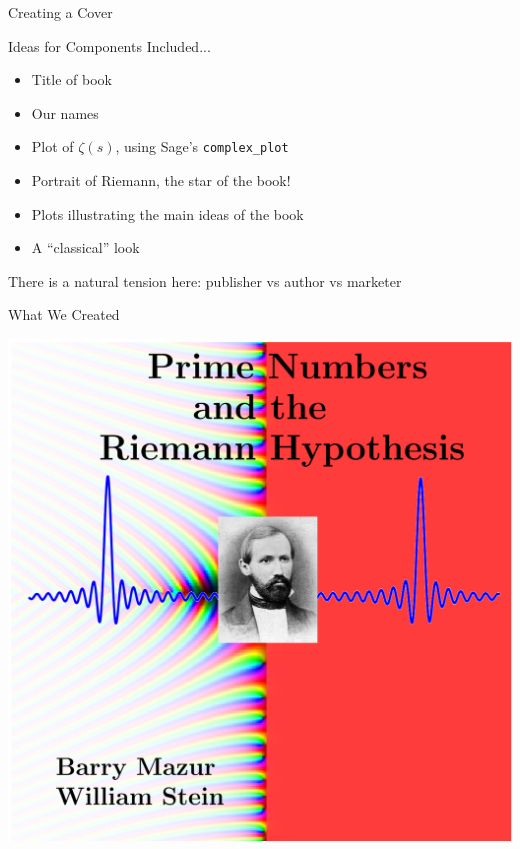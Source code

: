 \documentclass{beamer}
\begin{document}
\begin{frame}{Creating a Cover}


  \begin{block}{Ideas for Components Included...}
    \begin{itemize}
      \item Title of book
      \item Our names
      \item Plot of $\zeta(s)$, using Sage's {\tt complex\_plot}
      \item Portrait of Riemann, the star of the book!
      \item Plots illustrating the main ideas of the book
      \item A ``classical'' look
    \end{itemize}
  \end{block}

  \vfill
  There is a natural tension here: publisher vs author vs marketer

\end{frame}

\begin{frame}{What We Created}
  \begin{center}
    \includegraphics[height=.82\textheight]{pics/cover-we-wanted}
  \end{center}
\end{frame}
\end{document}
